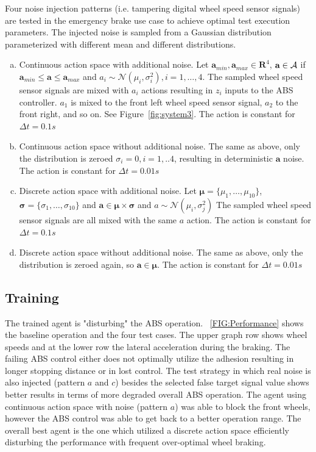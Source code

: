 \documentclass[a4paper, fleqn]{template/cas-dc}
\begin{document}
	Four noise injection patterns (i.e. tampering digital wheel speed sensor signals) are tested in the emergency brake use case to achieve optimal test execution parameters. The injected noise is sampled from a Gaussian distribution parameterized with different mean and different distributions.
	
	\begin{enumerate}[a)]
		\item Continuous action space with additional noise.
		Let $\textbf{a}_{min}, \textbf{a}_{max} \in \textbf{R}^4$, $\textbf{a} \in \mathcal{A}$ if $\textbf{a}_{min} \leq \textbf{a} \leq \textbf{a}_{max}$ and $a_i \sim \mathcal{N}(\mu_i, \sigma_i^2), i=1,\ldots,4$. The sampled wheel speed sensor signals are mixed with $a_i$ actions resulting in $z_i$ inputs to the ABS controller. $a_1$ is mixed to the front left wheel speed sensor signal, $a_2$ to the front right, and so on. See Figure~\ref{fig:system3}. The action is constant for $\Delta t = 0.1 s$
		\item Continuous action space without additional noise.
		The same as above, only the distribution is zeroed $\sigma_i=0, i=1,..4$, resulting in deterministic $\textbf{a}$ noise. The action is constant for $\Delta t = 0.01 s$
		\item Discrete action space with additional noise.
		Let $\boldsymbol{\mu} = \{\mu_1,\ldots,\mu_{10} \}$, $\boldsymbol{\sigma} = \{\sigma_1,\ldots,\sigma_{10}\}$ and $\textbf{a} \in \boldsymbol{\mu} \times \boldsymbol{\sigma}$ and $a \sim \mathcal{N}(\mu_i, \sigma_j^2)$ The sampled wheel speed sensor signals are all mixed with the same $a$ action. The action is constant for $\Delta t = 0.1 s$
		\item Discrete action space without additional noise.
		The same as above, only the distribution is zeroed again, so $\textbf{a} \in \boldsymbol{\mu}$. The action is constant for $\Delta t = 0.01 s$
	\end{enumerate}                        		
			
	\subsection{Training}
	The trained agent is "disturbing" the ABS operation. ~\autoref{FIG:Performance} shows the baseline operation and the four test cases. The upper graph row shows wheel speeds and at the lower row the lateral acceleration during the braking. The failing ABS control either does not optimally utilize the adhesion resulting in longer stopping distance or in lost control. The test strategy in which real noise is also injected (pattern $a$ and $c$) besides the selected false target signal value shows better results in terms of more degraded overall ABS operation. The agent using continuous action space with noise (pattern $a$) was able to block the front wheels, however the ABS control was able to get back to a better operation range. The overall best agent is the one which utilized a discrete action space efficiently disturbing the performance with frequent over-optimal wheel braking.
	
\end{document}

